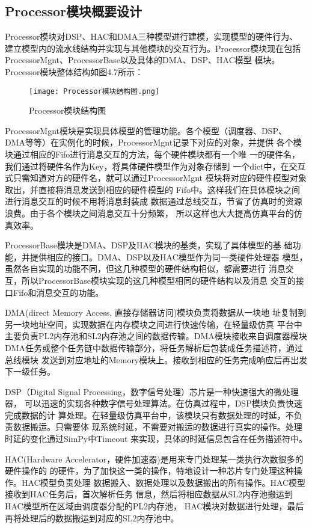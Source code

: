 \subsection{Processor模块概要设计}
Processor模块对DSP、HAC和DMA三种模型进行建模，实现模型的硬件行为、
建立模型内的流水线结构并实现与其他模块的交互行为\cite{33}。Processor模块现在包括
ProcessorMgnt、ProcessorBase以及具体的DMA、DSP、HAC模型
模块。Processor模块整体结构如图4.7所示：
\begin{figure}[htb]
    \centering
    \texttt{[image: Processor模块结构图.png]}
    \caption{Processor模块结构图}
    \label{fig:badge}
\end{figure}

ProcessorMgnt模块是实现具体模型的管理功能。各个模型（调度器、DSP、
DMA等等）在实例化的时候，ProcessorMgnt记录下对应的对象，并提供
各个模块通过相应的Fifo进行消息交互的方法，每个硬件模块都有一个唯
一的硬件名，我们通过将硬件名作为Key，将具体硬件模型作为对象存储到
一个dict中，在交互式只需知道对方的硬件名，就可以通过ProcessorMgnt
模块将对应的硬件模型对象取出，并直接将消息发送到相应的硬件模型的
Fifo中。这样我们在具体模块之间进行消息交互的时候不用将消息封装成
数据通过总线交互，节省了仿真时的资源浪费。由于各个模块之间消息交互十分频繁，
所以这样也大大提高仿真平台的仿真效率。

ProcessorBase模块是DMA、DSP及HAC模块的基类，实现了具体模型的基
础功能，并提供相应的接口。DMA、DSP以及HAC模型作为同一类硬件处理器
模型，虽然各自实现的功能不同，但这几种模型的硬件结构相似，都需要进行
消息交互，所以ProcessorBase模块实现的这几种模型相同的硬件结构以及消息
交互的接口Fifo和消息交互的功能。

DMA(direct Memory Access, 直接存储器访问)模块负责将数据从一块地
址复制到另一块地址空间，实现数据在内存模块之间进行快速传输，在轻量级仿真
平台中主要负责PL2内存池和SL2内存池之间的数据传输。DMA模块接收来自调度器模块
DMA任务或整个任务链中数据传输部分，将任务解析后包装成任务描述符，通过总线模块
发送到对应地址的Memory模块上。接收到相应的任务完成响应后再出发下一级任务。

DSP（Digital Signal Processing，数字信号处理）芯片是一种快速强大的微处理器，
可以迅速的实现各种数字信号处理算法。在仿真过程中，DSP模块负责快速完成数据的计
算处理。在轻量级仿真平台中，该模块只有数据处理的时延，不负责数据搬运。只需要体
现系统时延，不需要对搬运的数据进行真实的操作。处理时延的变化通过SimPy中Timeout
来实现，具体的时延信息包含在任务描述符中。

HAC(Hardware Accelerator，硬件加速器)是用来专门处理某一类执行次数很多的硬件操作的
的硬件，为了加快这一类的操作，特地设计一种芯片专门处理这种操作。HAC模型负责处理
数据搬入、数据处理以及数据搬出的所有操作。HAC模型接收到HAC任务后，首次解析任务
信息，然后将相应数据从SL2内存池搬运到HAC模型所在区域由调度器分配的PL2内存池，
HAC模块对数据进行处理，最后再将处理后的数据搬运到对应的SL2内存池中。

